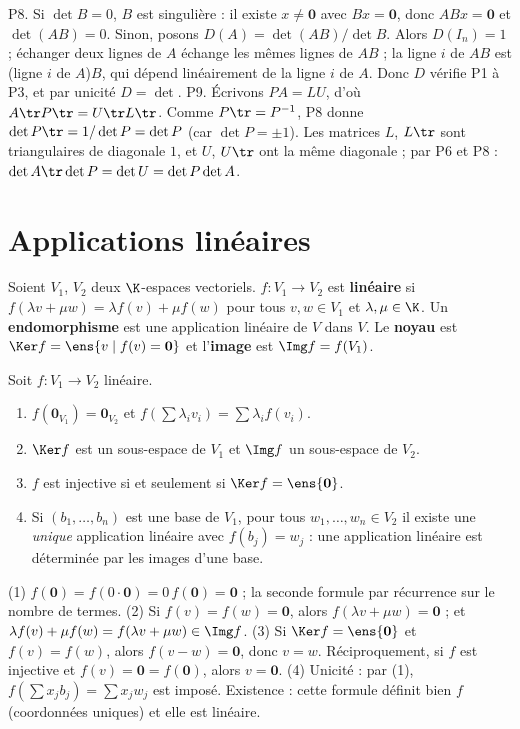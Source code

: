 \begin{preuve}
P8. Si $\det B=0$, $B$ est singulière : il existe $x\neq\mathbf 0$ avec $Bx=\mathbf 0$, donc $ABx=\mathbf 0$ et $\det(AB)=0$. Sinon, posons $D(A)=\det(AB)/\det B$. Alors $D(I_n)=1$ ; échanger deux lignes de $A$ échange les mêmes lignes de $AB$ ; la ligne $i$ de $AB$ est (ligne $i$ de $A$)$B$, qui dépend linéairement de la ligne $i$ de $A$. Donc $D$ vérifie P1 à P3, et par unicité $D=\det$.
P9. Écrivons $PA=LU$, d'où $A\tr P\tr=U\tr L\tr$. Comme $P\tr=P^{-1}$, P8 donne $\det P\tr=1/\det P=\det P$ (car $\det P=\pm1$). Les matrices $L$, $L\tr$ sont triangulaires de diagonale $1$, et $U$, $U\tr$ ont la même diagonale ; par P6 et P8 : $\det A\tr\det P=\det U=\det P\det A$.
\end{preuve}

\section{Applications linéaires}
\begin{definition}
Soient $V_1$, $V_2$ deux $\K$-espaces vectoriels. $f:V_1\to V_2$ est \textbf{linéaire} si $f(\lambda v+\mu w)=\lambda f(v)+\mu f(w)$ pour tous $v,w\in V_1$ et $\lambda,\mu\in\K$. Un \textbf{endomorphisme} est une application linéaire de $V$ dans $V$. Le \textbf{noyau} est $\Ker f=\ens{v\mid f(v)=\mathbf 0}$ et l'\textbf{image} est $\Img f=f(V_1)$.
\end{definition}
\begin{proposition}\label{prop-lineaire}
Soit $f:V_1\to V_2$ linéaire.
\begin{enumerate}
\item $f(\mathbf 0_{V_1})=\mathbf 0_{V_2}$ et $f(\sum\lambda_iv_i)=\sum\lambda_if(v_i)$.
\item $\Ker f$ est un sous-espace de $V_1$ et $\Img f$ un sous-espace de $V_2$.
\item $f$ est injective si et seulement si $\Ker f=\ens{\mathbf 0}$.
\item Si $(b_1,\dots,b_n)$ est une base de $V_1$, pour tous $w_1,\dots,w_n\in V_2$ il existe une \emph{unique} application linéaire avec $f(b_j)=w_j$ : une application linéaire est déterminée par les images d'une base.
\end{enumerate}
\end{proposition}
\begin{preuve}
(1) $f(\mathbf 0)=f(0\cdot\mathbf 0)=0\,f(\mathbf 0)=\mathbf 0$ ; la seconde formule par récurrence sur le nombre de termes. (2) Si $f(v)=f(w)=\mathbf 0$, alors $f(\lambda v+\mu w)=\mathbf 0$ ; et $\lambda f(v)+\mu f(w)=f(\lambda v+\mu w)\in\Img f$. (3) Si $\Ker f=\ens{\mathbf 0}$ et $f(v)=f(w)$, alors $f(v-w)=\mathbf 0$, donc $v=w$. Réciproquement, si $f$ est injective et $f(v)=\mathbf 0=f(\mathbf 0)$, alors $v=\mathbf 0$. (4) Unicité : par (1), $f(\sum x_jb_j)=\sum x_jw_j$ est imposé. Existence : cette formule définit bien $f$ (coordonnées uniques) et elle est linéaire.
\end{preuve}
